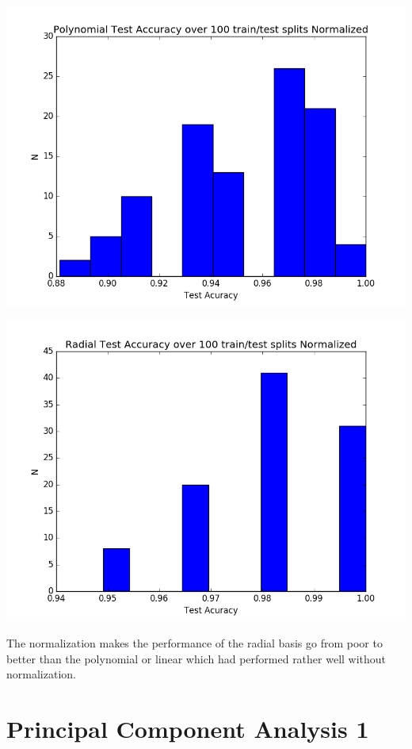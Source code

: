 \documentclass[12pt]{article}
\begin{document}
\begin{flushleft}
			\includegraphics[scale=0.5]{HW3_1D_1.png}
			\label{fig:graph 1D.2}
			
			\includegraphics[scale=0.5]{HW3_1D_2.png}
			\label{fig:graph 1D.3}
			
			
			The normalization makes the performance of the radial basis go from poor to better than the polynomial or linear which had performed rather well without normalization.\\
		
		\section{Principal Component Analysis 1}
		

\end{flushleft}
\end{document}
